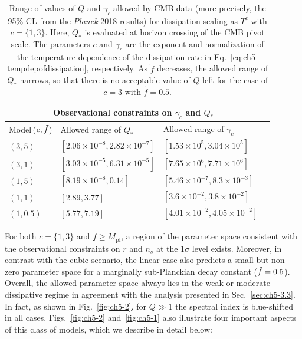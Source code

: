 \begin{table}[ht!]
\def\arraystretch{1.5}
\centering
    \begin{tabular}{l>{\raggedleft}p{}>{\raggedleft\arraybackslash}p{}>{\raggedleft\arraybackslash}p{}}
    \toprule
     \hline
     \multicolumn{3}{c}{Observational constraints on $\gamma_c$ and $Q_{*}$}\\
     \hline
Model\,($c,\Tilde{f}$) & Allowed range of $Q_{*}$ & Allowed range of $\gamma_c$\\
    \hline
    $(3,5)$ & $[2.06\times 10^{-8},2.82\times 10^{-7}]$ & $[1.53\times10^5,3.04\times10^5]$ \\
    $(3,1)$ & $[3.03\times10^{-5},6.31\times 10^{-5}]$ & $[7.65\times10^6,7.71\times10^6]$\\
    $(1,5)$ & $[8.19\times 10^{-8}, 0.14]$ & $[5.46\times 10^{-7},8.3\times 10^{-3}]$\\
    $(1,1)$ & $[2.89, 3.77]$ & $[3.6\times 10^{-2},3.8\times 10^{-2}]$ \\
    $(1,0.5)$ & $[5.77,7.19]$ & $[4.01\times 10^{-2},4.05\times 10^{-2}]$\\
    \hline
    \bottomrule
    \end{tabular}
    \caption[Observational constraints on dissipation parameters]{Range of values of $Q$ and $\gamma_c$ allowed by CMB data (more precisely, the 95\% CL from the \textit{Planck} 2018 results) for dissipation scaling as $T^c$ with $c=\{1,3\}$. Here, $Q_*$ is evaluated at horizon crossing of the CMB pivot scale. The parameters $c$ and $\gamma_c$ are the exponent and normalization of the temperature dependence of the dissipation rate in Eq.~\ref{eq:ch5-tempdepofdissipation}, respectively. As $\tilde f$ decreases, the allowed range of $Q_*$ narrows, so that there is no acceptable value of $Q$ left for the case of $c=3$ with $\tilde f = 0.5$.}
    \label{tab:ch5-1}
\end{table}

For both $c=\{1,3\}$ and $f\geq M_\mathrm{pl}$, a region of the parameter space consistent with the observational constraints on $r$ and $n_s$ at the 1$\sigma$ level exists. Moreover, in contrast with the cubic scenario, the linear case also predicts a small but non-zero parameter space for a marginally sub-Planckian decay constant ($\Tilde{f}=0.5$). Overall, the allowed parameter space always lies in the weak or moderate dissipative regime in agreement with the analysis presented in Sec.~\ref{sec:ch5-3.3}. In fact, as shown in Fig.~\ref{fig:ch5-2}, for $Q\gg 1$ the spectral index is blue-shifted in all cases. Figs.~\ref{fig:ch5-2} and~\ref{fig:ch5-1} also illustrate four important aspects of this class of models, which we describe in detail below:

